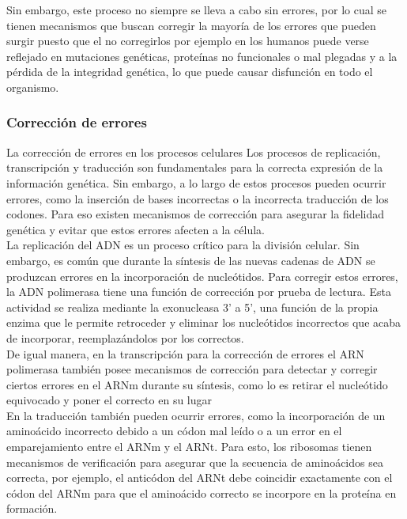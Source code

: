 \documentclass[12pt]{article}
\begin{document}
Sin embargo, este proceso no siempre se lleva a cabo sin errores, por lo cual se tienen mecanismos que buscan corregir la mayoría de los errores que pueden surgir puesto que el no corregirlos por ejemplo en los humanos puede verse reflejado en mutaciones genéticas, proteínas no funcionales o mal plegadas y a la pérdida de la integridad genética, lo que puede causar disfunción en todo el organismo.\\

\subsubsection{Corrección de errores}

La corrección de errores en los procesos celulares
Los procesos de replicación, transcripción y traducción son fundamentales para la correcta expresión de la información genética. Sin embargo, a lo largo de estos procesos pueden ocurrir errores, como la inserción de bases incorrectas o la incorrecta traducción de los codones. Para eso existen mecanismos de corrección para asegurar la fidelidad genética y evitar que estos errores afecten a la célula.\\

La replicación del ADN es un proceso crítico para la división celular. Sin embargo, es común que durante la síntesis de las nuevas cadenas de ADN se produzcan errores en la incorporación de nucleótidos. Para corregir estos errores, la ADN polimerasa tiene una función de corrección por prueba de lectura. Esta actividad se realiza mediante la exonucleasa 3' a 5', una función de la propia enzima que le permite retroceder y eliminar los nucleótidos incorrectos que acaba de incorporar, reemplazándolos por los correctos.\\

De igual manera, en la transcripción para la corrección de errores el ARN polimerasa también posee mecanismos de corrección para detectar y corregir ciertos errores en el ARNm durante su síntesis, como lo es retirar el nucleótido equivocado y poner el correcto en su lugar\\

En la traducción también pueden ocurrir errores, como la incorporación de un aminoácido incorrecto debido a un códon mal leído o a un error en el emparejamiento entre el ARNm y el ARNt. Para esto, los ribosomas tienen mecanismos de verificación para asegurar que la secuencia de aminoácidos sea correcta, por ejemplo, el anticódon del ARNt debe coincidir exactamente con el códon del ARNm para que el aminoácido correcto se incorpore en la proteína en formación.\\
\end{document}
